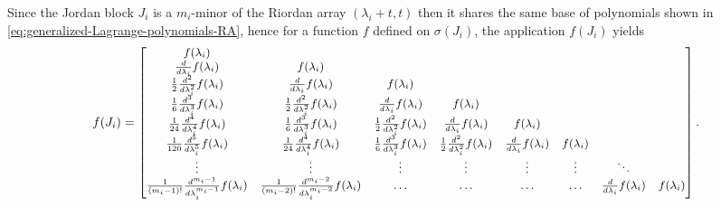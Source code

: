 \begin{remark}
Since the Jordan block $J_{i}$ is a $m_{i}$-minor of the Riordan array $\left(\lambda_{i}+t,
t\right)$ then it shares the same base of polynomials shown in
\autoref{eq:generalized-Lagrange-polynomials-RA}, hence for a function $f$
defined on $\sigma(J_{i})$, the application $f(J_{i})$ yields
\begin{displaymath}
\small
f{\left (J_{i} \right )} = \left[\begin{matrix}f{\left (\lambda_{i} \right )} &  &  &  &  &  &  & \\\frac{d}{d \lambda_{i}} f{\left (\lambda_{i} \right )} & f{\left (\lambda_{i} \right )} &  &  &  &  &  & \\\frac{1}{2} \frac{d^{2}}{d \lambda_{i}^{2}}  f{\left (\lambda_{i} \right )} & \frac{d}{d \lambda_{i}} f{\left (\lambda_{i} \right )} & f{\left (\lambda_{i} \right )} &  &  &  &  & \\\frac{1}{6} \frac{d^{3}}{d \lambda_{i}^{3}}  f{\left (\lambda_{i} \right )} & \frac{1}{2} \frac{d^{2}}{d \lambda_{i}^{2}}  f{\left (\lambda_{i} \right )} & \frac{d}{d \lambda_{i}} f{\left (\lambda_{i} \right )} & f{\left (\lambda_{i} \right )} &  &  &  & \\\frac{1}{24} \frac{d^{4}}{d \lambda_{i}^{4}}  f{\left (\lambda_{i} \right )} & \frac{1}{6} \frac{d^{3}}{d \lambda_{i}^{3}}  f{\left (\lambda_{i} \right )} & \frac{1}{2} \frac{d^{2}}{d \lambda_{i}^{2}}  f{\left (\lambda_{i} \right )} & \frac{d}{d \lambda_{i}} f{\left (\lambda_{i} \right )} & f{\left (\lambda_{i} \right )} &  &  & \\\frac{1}{120} \frac{d^{5}}{d \lambda_{i}^{5}}  f{\left (\lambda_{i} \right )} & \frac{1}{24} \frac{d^{4}}{d \lambda_{i}^{4}}  f{\left (\lambda_{i} \right )} & \frac{1}{6} \frac{d^{3}}{d \lambda_{i}^{3}}  f{\left (\lambda_{i} \right )} & \frac{1}{2} \frac{d^{2}}{d \lambda_{i}^{2}}  f{\left (\lambda_{i} \right )} & \frac{d}{d \lambda_{i}} f{\left (\lambda_{i} \right )} & f{\left (\lambda_{i} \right )} &  & \\ \vdots &  \vdots &  \vdots &  \vdots &  \vdots &  \vdots & \ddots & \\\frac{1}{(m_{i}-1)!} \frac{d^{m_{i}-1}}{d \lambda_{i}^{m_{i}-1}}  f{\left (\lambda_{i} \right )} & \frac{1}{(m_{i}-2)!} \frac{d^{m_{i}-2}}{d \lambda_{i}^{m_{i}-2}}  f{\left (\lambda_{i} \right )} & \ldots & \ldots & \ldots & \ldots & \frac{d}{d \lambda_{i}} f{\left (\lambda_{i} \right )} & f{\left (\lambda_{i} \right )}\end{matrix}\right].
\end{displaymath}
\end{remark}

